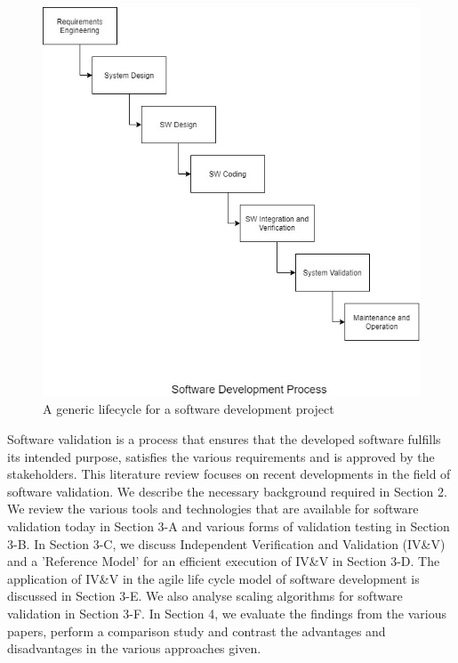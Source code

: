 \documentclass[journal, onecolumn]{IEEEtran}
\begin{document}
	\begin{figure}[h]
		\includegraphics[scale=0.35]{process.jpg}
		\centering
		\caption{A generic lifecycle for a software development project}
	\end{figure}
	
	Software validation is a process that ensures that the developed software fulfills its intended purpose, satisfies the various requirements and is approved by the stakeholders. This literature review focuses on recent developments in the field of software validation. We describe the necessary background required in Section 2. We review the various tools and technologies that are available for software validation today \cite{tools} in Section 3-A and various forms of validation testing \cite{regression}\cite{trace}\cite{hazard} in Section 3-B. In Section 3-C, we discuss Independent Verification and Validation (IV\&V) \cite{ivv} and a 'Reference Model' for an efficient execution of IV\&V \cite{refmod} in Section 3-D. The application of IV\&V in the agile life cycle model of software development \cite{agile} is discussed in Section 3-E. We also analyse scaling algorithms for software validation \cite{ref:algo} in Section 3-F. In Section 4, we evaluate the findings from the various papers, perform a comparison study and contrast the advantages and disadvantages in the various approaches given.
	
\end{document}
